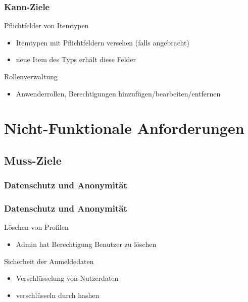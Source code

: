 \documentclass{beamer}
\begin{document}
\begin{frame}
\frametitle{Kann-Ziele}

\begin{block}{Pflichtfelder von Itemtypen}
\begin{itemize}
\item Itemtypen mit Pflichtfeldern versehen (falls angebracht)
\item neue Item des Typs erhält diese Felder
\end{itemize}
\end{block}

\begin{block}{Rollenverwaltung}
\begin{itemize}
\item Anwenderrollen, Berechtigungen hinzufügen/bearbeiten/entfernen
\end{itemize}
\end{block}

\end{frame}

\section{Nicht-Funktionale Anforderungen}

\subsection{Muss-Ziele}

\subsubsection{Datenschutz und Anonymität}

\begin{frame}
\frametitle{Datenschutz und Anonymität}

\begin{block}{Löschen von Profilen}
\begin{itemize}
\item Admin hat Berechtigung Benutzer zu löschen
\end{itemize}
\end{block}

\begin{block}{Sicherheit der Anmeldedaten}
\begin{itemize}
\item Verschlüsselung von Nutzerdaten
\item verschlüsseln durch hashen
\end{itemize}
\end{block}

\end{frame}
\end{document}
